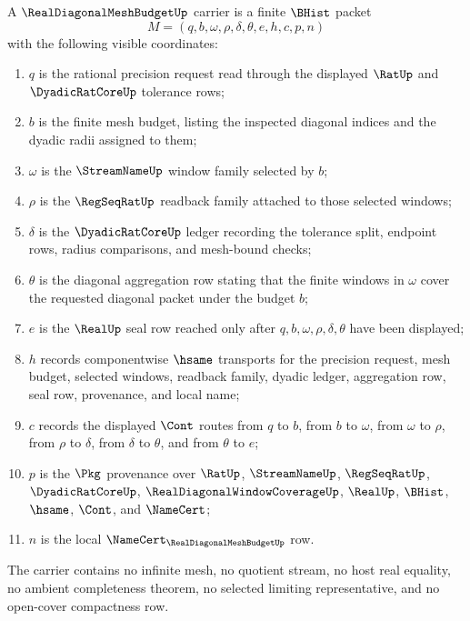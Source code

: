 \begin{definition}
\label{def:real-diagonal-mesh-budget-carrier}
A $\RealDiagonalMeshBudgetUp$ carrier is a finite $\BHist$ packet
$$
M=(q,b,\omega,\rho,\delta,\theta,e,h,c,p,n)
$$
with the following visible coordinates:
\begin{enumerate}
\item $q$ is the rational precision request read through the displayed $\RatUp$ and $\DyadicRatCoreUp$ tolerance rows;
\item $b$ is the finite mesh budget, listing the inspected diagonal indices and the dyadic radii assigned to them;
\item $\omega$ is the $\StreamNameUp$ window family selected by $b$;
\item $\rho$ is the $\RegSeqRatUp$ readback family attached to those selected windows;
\item $\delta$ is the $\DyadicRatCoreUp$ ledger recording the tolerance split, endpoint rows, radius comparisons, and mesh-bound checks;
\item $\theta$ is the diagonal aggregation row stating that the finite windows in $\omega$ cover the requested diagonal packet under the budget $b$;
\item $e$ is the $\RealUp$ seal row reached only after $q,b,\omega,\rho,\delta,\theta$ have been displayed;
\item $h$ records componentwise $\hsame$ transports for the precision request, mesh budget, selected windows, readback family, dyadic ledger, aggregation row, seal row, provenance, and local name;
\item $c$ records the displayed $\Cont$ routes from $q$ to $b$, from $b$ to $\omega$, from $\omega$ to $\rho$, from $\rho$ to $\delta$, from $\delta$ to $\theta$, and from $\theta$ to $e$;
\item $p$ is the $\Pkg$ provenance over $\RatUp$, $\StreamNameUp$, $\RegSeqRatUp$, $\DyadicRatCoreUp$, $\RealDiagonalWindowCoverageUp$, $\RealUp$, $\BHist$, $\hsame$, $\Cont$, and $\NameCert$;
\item $n$ is the local $\NameCert_{\RealDiagonalMeshBudgetUp}$ row.
\end{enumerate}
The carrier contains no infinite mesh, no quotient stream, no host real equality, no ambient completeness theorem, no selected limiting representative, and no open-cover compactness row.
\end{definition}

